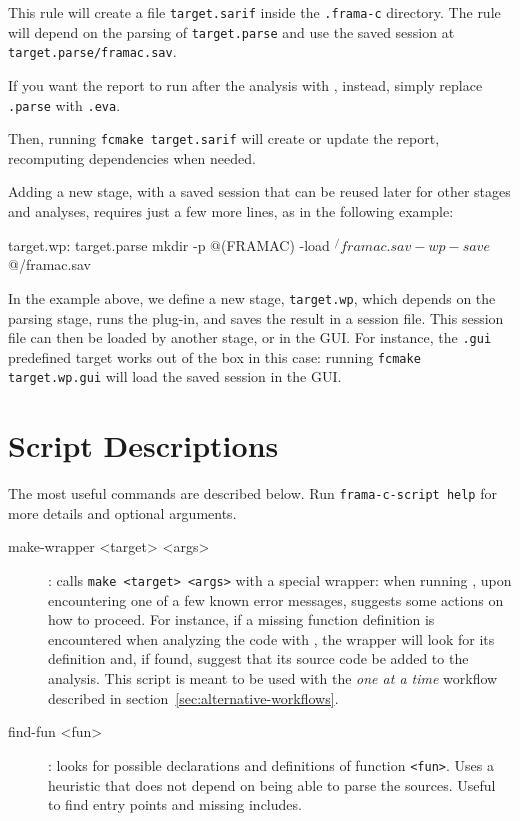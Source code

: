 This rule will create a file \texttt{target.sarif} inside the \texttt{.frama-c}
directory. The rule will depend on the parsing of \texttt{target.parse} and
use the saved session at \texttt{target.parse/framac.sav}.

If you want the report to run after the analysis with \Value, instead, simply
replace \texttt{.parse} with \texttt{.eva}.

Then, running \texttt{fcmake target.sarif} will create or update the report,
recomputing dependencies when needed.

Adding a new stage, with a saved session that can be reused later for other
stages and analyses, requires just a few more lines, as in the following
example:

\begin{makefilecode}
target.wp: target.parse
	mkdir -p $@
	$(FRAMAC) -load $^/framac.sav -wp -save $@/framac.sav
\end{makefilecode}

In the example above, we define a new stage, \texttt{target.wp}, which depends
on the parsing stage, runs the  plug-in, and saves the result in a
session file. This session file can then be loaded by another stage,
or in the GUI. For instance, the \texttt{.gui} predefined target works out
of the box in this case: running \texttt{fcmake target.wp.gui} will load
the saved session in the GUI.

\section{Script Descriptions}
\label{sec:script-descriptions}

The most useful commands are described below.
Run \texttt{frama-c-script help} for more details and optional arguments.

\begin{description}
\item[make-wrapper <target> <args>]: calls \texttt{make <target> <args>} with
  a special wrapper: when running \Value, upon encountering one of a few known
  error messages, suggests some actions on how to proceed.
  For instance, if a missing function definition is encountered when analyzing
  the code with \Value, the wrapper will look for its definition and, if found,
  suggest that its source code be added to the analysis. This script is meant
  to be used with the {\em one at a time} workflow described in
  section~\ref{sec:alternative-workflows}.
\item[find-fun <fun>]: looks for possible declarations and definitions
  of function \texttt{<fun>}. Uses a heuristic that does not depend on \FramaC
  being able to parse the sources. Useful to find entry points and missing
  includes.
\end{description}

